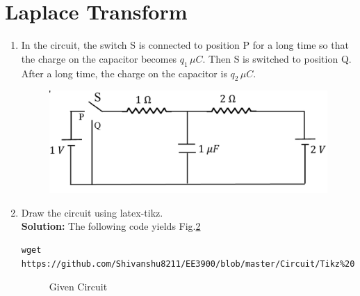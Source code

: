 \documentclass[journal,12pt,twocolumn]{IEEEtran}
\newcommand{\solution}{\noindent \textbf{Solution: }}
\numberwithin{equation}{section}
\renewcommand\thesection{\arabic{section}}
\begin{document}
 \section{Laplace Transform}
\begin{enumerate}[label=\arabic*.,ref=\thesection.\theenumi]
\item In the circuit, the switch S is connected to position P for a long time so that the charge on the capacitor
	becomes $q_1 \, \mu C$. Then S is switched to position Q.  After a long time, the charge on the capacitor is
		$q_2 \, \mu C$.
		\begin{figure}[!ht]
			\centering
			\includegraphics[width=\columnwidth]{figs/ckt.jpg}
			\caption{}
			\label{fig:ckt}
		\end{figure}
\item Draw the circuit using latex-tikz.\\
\solution The following code yields Fig.\ref{fig:qn}
\begin{lstlisting}
wget https://github.com/Shivanshu8211/EE3900/blob/master/Circuit/Tikz%20Circuits/2.2.tex
\end{lstlisting}
\begin{figure}[!ht]
 \centering
  
\caption{Given Circuit}
\label{fig:qn}
\end{figure}


\end{enumerate}
\end{document}
